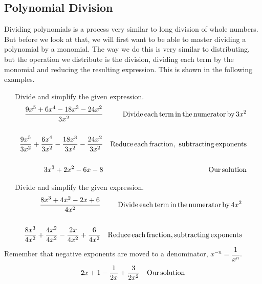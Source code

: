 \subsection{Polynomial Division}\pp

{}\pp

Dividing polynomials is a process very similar to long division of whole
numbers. But before we look at that, we will first want to be able to master
dividing a polynomial by a monomial. The way we do this is very similar to
distributing, but the operation we distribute is the division, dividing each
term by the monomial and reducing the resulting expression. This is shown in
the following examples.

\begin{example}~~~Divide and simplify the given expression.
  \begin{eqnarray*}
    \frac{9 x^5 + 6 x^4 - 18 x^3 - 24 x^2}{3 x^2} &  & \operatorname{Divide}
    \operatorname{each} \operatorname{term} \operatorname{in} \operatorname{the} \operatorname{numerator} \operatorname{by} 3
    x^2\\
    &  & \\
    \frac{9 x^5}{3 x^2} + \frac{6 x^4}{3 x^2} - \frac{18 x^3}{3 x^2} -
    \frac{24 x^2}{3 x^2} &  & \operatorname{Reduce} \operatorname{each} \operatorname{fraction},
    \operatorname{~subtracting} \operatorname{exponents}\\
    &  & \\
    3 x^3 + 2 x^2 - 6 x - 8 &  & \operatorname{Our} \operatorname{solution}
  \end{eqnarray*}
\end{example}

\begin{example}~~~Divide and simplify the given expression.
  \begin{eqnarray*}
    \frac{8 x^3 + 4 x^2 - 2 x + 6}{4 x^2} &  & \operatorname{Divide} \operatorname{each}
    \operatorname{term} \operatorname{in} \operatorname{the} \operatorname{numerator} \operatorname{by} 4 x^2\\
    &  & \\
    \frac{8 x^3}{4 x^2} + \frac{4 x^2}{4 x^2} - \frac{2 x}{4 x^2} + \frac{6}{4
    x^2} &  & \operatorname{Reduce} \operatorname{each} \operatorname{fraction}, \operatorname{subtracting}
    \operatorname{exponents}
	\end{eqnarray*}
	Remember that negative exponents are moved to a denominator, $x^{-n}=\dfrac{1}{x^n}$.
	\begin{eqnarray*}
    2 x + 1 - \frac{1}{2 x} + \frac{3}{2 x^2} &  & \operatorname{Our} \operatorname{solution}
  \end{eqnarray*}
\end{example}


